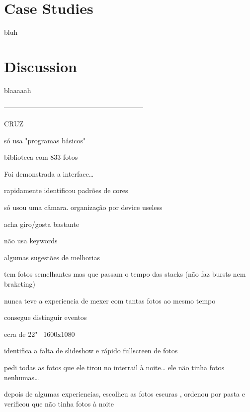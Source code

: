 \section{Case Studies}

bluh

\section{Discussion}

blaaaaah


————————————————————

CRUZ

\begin{myitemize}

	\item * só usa "programas básicos"

	\item biblioteca com 833 fotos

	\item Foi demonstrada a interface…

	\item * rapidamente identificou padrões de cores

	\item só usou uma câmara. organização por device useless

	\item * acha giro/gosta bastante

	\item não usa keywords

	\item * algumas sugestões de melhorias

	\item tem fotos semelhantes mas que passam o tempo das stacks (não faz bursts nem braketing)

	\item * nunca teve a experiencia de mexer com tantas fotos ao mesmo tempo

	\item * consegue distinguir eventos

	\item ecra de 22" ~1600x1080

	\item * identifica a falta de slideshow e rápido fullscreen de fotos

	\item pedi todas as fotos que ele tirou no interrail à noite… ele não tinha fotos nenhumas…

	\item depois de algumas experiencias, escolheu as fotos escuras , ordenou por pasta e verificou que não tinha fotos à noite


\end{myitemize}

